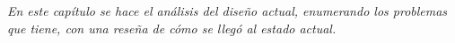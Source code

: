 
\textit{En este capítulo se hace el análisis del diseño actual, enumerando los problemas que tiene, con una reseña de cómo se llegó al estado actual.}
